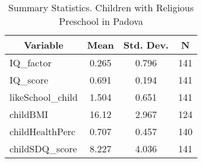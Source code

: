 
\begin{table}[htbp]\centering \caption{Summary Statistics. Children with Religious Preschool in Padova \label{bothChildmaternaReliPadova}}
\begin{tabular}{l c c  c}\hline\hline
\multicolumn{1}{c}{\textbf{Variable}} & \textbf{Mean}
 & \textbf{Std. Dev.} & \textbf{N}\\ \hline
IQ\_factor & 0.265 & 0.796  & 141\\
IQ\_score & 0.691 & 0.194  & 141\\
likeSchool\_child & 1.504 & 0.651  & 141\\
childBMI & 16.12 & 2.967  & 124\\
childHealthPerc & 0.707 & 0.457  & 140\\
childSDQ\_score & 8.227 & 4.036  & 141\\
\hline\end{tabular}
\end{table}

